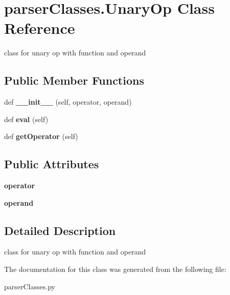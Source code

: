 \hypertarget{classparser_classes_1_1_unary_op}{}\section{parser\+Classes.\+Unary\+Op Class Reference}
\label{classparser_classes_1_1_unary_op}


class for unary op with function and operand  


\subsection*{Public Member Functions}
\begin{DoxyCompactItemize}
\item 
\mbox{\label{classparser_classes_1_1_unary_op_acd865fc282d065da966ee8ae6fd1221c}} 
def {\bfseries \+\_\+\+\_\+init\+\_\+\+\_\+} (self, operator, operand)
\item 
\mbox{\label{classparser_classes_1_1_unary_op_a3bcb0143d84e533f554616cf279910c1}} 
def {\bfseries eval} (self)
\item 
\mbox{\label{classparser_classes_1_1_unary_op_afa168433abdb12ff7376e1bfe4f6d347}} 
def {\bfseries get\+Operator} (self)
\end{DoxyCompactItemize}
\subsection*{Public Attributes}
\begin{DoxyCompactItemize}
\item 
\mbox{\label{classparser_classes_1_1_unary_op_a5207cf805eeb0fb6dc3386378216600d}} 
{\bfseries operator}
\item 
\mbox{\label{classparser_classes_1_1_unary_op_a45cebabb240f349eb45b24331bb6323c}} 
{\bfseries operand}
\end{DoxyCompactItemize}


\subsection{Detailed Description}
class for unary op with function and operand 

The documentation for this class was generated from the following file\+:\begin{DoxyCompactItemize}
\item 
parser\+Classes.\+py\end{DoxyCompactItemize}
